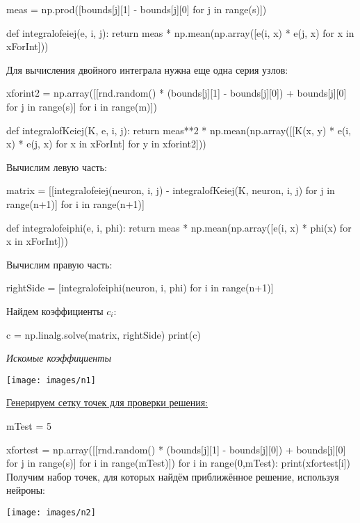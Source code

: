 \documentclass[12pt]{article}
\begin{document}
meas = np.prod([bounds[j][1] - bounds[j][0] for j in range(s)]) \vskip 0.3cm

def integralofeiej(e, i, j): \vskip 0.3cm
return meas * np.mean(np.array([e(i, x) * e(j, x) for x in xForInt])) \vskip 0.3cm

Для вычисления двойного интеграла нужна еще одна серия узлов: \vskip 0.3cm

xforint2 = np.array([[rnd.random() * (bounds[j][1] - bounds[j][0]) + bounds[j][0] for j in range(s)] 
for i in range(m)])  \vskip 0.3cm

def integralofKeiej(K, e, i, j): \vskip 0.3cm
return meas**2 * np.mean(np.array([[K(x, y) * e(i, x) * e(j, x) for x in xForInt] for y in xforint2])) \vskip 0.3cm

Вычислим левую часть: \vskip 0.3cm

matrix = [[integralofeiej(neuron, i, j) - integralofKeiej(K, neuron, i, j) for j in range(n+1)] for i in range(n+1)] \vskip 0.3cm

def integralofeiphi(e, i, phi): \vskip 0.3cm
return meas * np.mean(np.array([e(i, x) * phi(x) for x in xForInt])) \vskip 0.3cm

Вычислим правую часть: \vskip 0.3cm

rightSide = [integralofeiphi(neuron, i, phi)  for i in range(n+1)] \vskip 0.3cm

Найдем коэффициенты $c_i$: \vskip 0.3cm

c = np.linalg.solve(matrix, rightSide) \vskip 0.3cm
print(c) 
\begin{center}
	\textit{Искомые коэффициенты}
\end{center}

\texttt{[image: images/n1]}  \\




\begin{center}
\underline{	Генерируем сетку точек для проверки решения:}
\end{center}

mTest = 5 \vskip 0.3cm

xfortest = np.array([[rnd.random() * (bounds[j][1] - bounds[j][0]) + bounds[j][0] for j in range(s)] for i in range(mTest)]) \vskip 0.3cm
for i in range(0,mTest): \vskip 0.3cm
print(xfortest[i]) \vskip 0.3cm
Получим набор точек, для которых найдём приближённое решение, используя нейроны:

\texttt{[image: images/n2]}  \\
\end{document}

